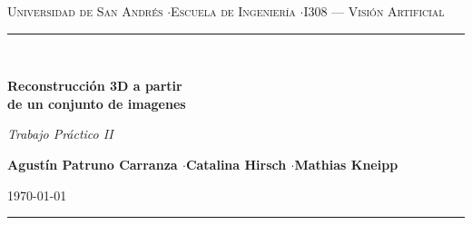 \documentclass[10pt,a4paper]{article}
\begin{document}
\begingroup
\centering
{\footnotesize\scshape\color{black!70} Universidad de San Andrés \quad$\cdot$\quad Escuela de Ingeniería \quad$\cdot$\quad I308 --- Visión Artificial}\\[4pt]
{\color{black!25}\rule{\linewidth}{0.6pt}}\\[10pt]
{\fontsize{20}{24}\selectfont\bfseries\color{black}
Reconstrucción 3D a partir\\[2pt]
de un conjunto de imagenes\par}
\vspace{6pt}
{\normalsize\itshape\color{black!70} Trabajo Práctico II\par}
\vspace{10pt}
{\normalsize\bfseries Agustín Patruno Carranza \quad$\cdot$\quad Catalina Hirsch \quad$\cdot$\quad Mathias Kneipp\par}
\vspace{2pt}
{\footnotesize\color{black!60}\today\par}
\vspace{4pt}
{\color{black!25}\rule{\linewidth}{0.6pt}}
\endgroup
\vspace{10pt}

\begin{abstract}
\noindent

\end{abstract}
\end{document}
